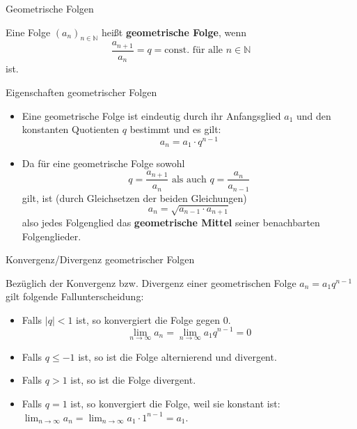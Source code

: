 \begin{frame}{Geometrische Folgen}
	\begin{definition}
		Eine Folge $(a_{n})_{n \in \mathbb{N}}$ heißt \textbf{geometrische Folge}, wenn 
		\[
		\frac{a_{n+1}}{a_{n}} = q = \mbox{const. für alle } n \in \mathbb{N}   
		\]
		ist.
	\end{definition}
\end{frame}	
\begin{frame}{Eigenschaften geometrischer Folgen}
	\begin{bemerkung}
		\begin{itemize}
		\item Eine geometrische Folge ist eindeutig durch ihr Anfangsglied $a_{1}$ und den konstanten Quotienten $q$ bestimmt und es gilt:
		\[
			a_{n} = a_{1} \cdot q^{n-1}
		\]
		\item Da für eine geometrische Folge sowohl
		\[
		q = \frac{a_{n+1}}{a_{n}} \mbox{ als auch } q = \frac{a_{n}}{a_{n-1}}
		\]
		gilt, ist  (durch Gleichsetzen der beiden Gleichungen)
		\[
			a_{n} = \sqrt{a_{n-1} \cdot a_{n+1}}
		\]
		also jedes Folgenglied das \textbf{geometrische Mittel} seiner benachbarten Folgenglieder.
		\end{itemize} 
	\end{bemerkung}
\end{frame}

\begin{frame}{Konvergenz/Divergenz geometrischer Folgen}
	\begin{bemerkung}
	Bezüglich der Konvergenz bzw. Divergenz einer geometrischen Folge $a_{n} = a_{1} q^{n-1}$ gilt folgende Fallunterscheidung:
	\begin{itemize}
		\item Falls $|q| < 1$ ist, so konvergiert die Folge gegen 0. 
		\[
		\lim_{n \to \infty} a_{n} = \lim_{n \to \infty} a_{1} q^{n-1} = 0
		\]
		\item Falls $q\leq-1$ ist, so ist die Folge alternierend und divergent.
		\item Falls $q>1$ ist, so ist die Folge divergent.
		\item Falls $q=1$ ist, so konvergiert die Folge, weil sie konstant ist: $\lim_{n \to \infty} a_{n} = \lim_{n \to \infty} a_{1} \cdot 1^{n-1} = a_{1}$.
	\end{itemize}
	\end{bemerkung}	
\end{frame}

